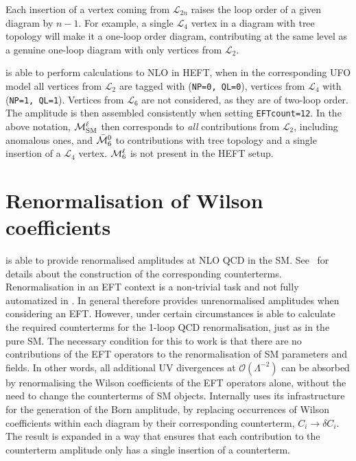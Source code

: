 Each insertion of a vertex coming from $\mathcal{L}_{2n}$ raises the loop order of a given diagram by $n-1$. For example, a single $\mathcal{L}_4$ vertex in a diagram with tree topology will make it a one-loop order diagram, contributing at the same level as a genuine one-loop diagram with only vertices from $\mathcal{L}_2$.

\gosam is able to perform calculations to NLO in HEFT, when in the corresponding UFO model all vertices from $\mathcal{L}_2$ are tagged with (\texttt{NP=0, QL=0}), vertices from $\mathcal{L}_4$ with (\texttt{NP=1, QL=1}). Vertices from $\mathcal{L}_6$ are not considered, as they are of two-loop order. The amplitude is then assembled consistently when setting \texttt{EFTcount=12}. In the above notation, $\mathcal{M}_\mathrm{SM}^\ell$ then corresponds to \emph{all} contributions from $\mathcal{L}_2$, including anomalous ones, and $\bar{\mathcal{M}}_6^0$ to contributions with tree topology and a single insertion of a $\mathcal{L}_4$ vertex. $\mathcal{M}_6^\ell$ is not present in the HEFT setup.

\section{Renormalisation of Wilson coefficients}\label{sec:EFTrenorm}
\gosam is able to provide renormalised amplitudes at NLO QCD in the SM. See~\cite{Cullen:2011ac} for details about the construction of the corresponding counterterms. Renormalisation in an EFT context is a non-trivial task and not fully automatized in \gosam. In general \gosam therefore provides unrenormalised amplitudes when considering an EFT. However, under certain circumstances \gosam is able to calculate the required counterterms for the 1-loop QCD renormalisation, just as in the pure SM. The necessary condition for this to work is that there are no contributions of the EFT operators to the renormalisation of SM parameters and fields. In other words, all additional UV divergences at $\mathcal{O}\left(\Lambda^{-2}\right)$ can be absorbed by renormalising the Wilson coefficients of the EFT operators alone, without the need to change the counterterms of SM objects. Internally \gosam uses its infrastructure for the generation of the Born amplitude, by replacing occurrences of Wilson coefficients within each diagram by their corresponding counterterm, $C_i\to \delta C_i$. The result is expanded in a way that ensures that each contribution to the counterterm amplitude only has a single insertion of a counterterm.

